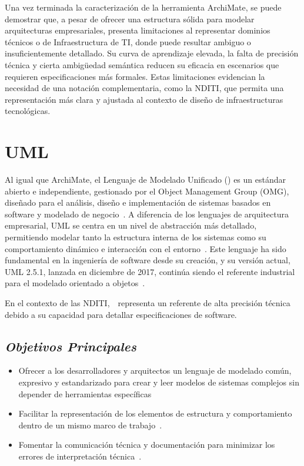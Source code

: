 Una vez terminada la caracterización de la herramienta ArchiMate, se puede demostrar que, a pesar de ofrecer una estructura sólida para modelar arquitecturas empresariales, presenta limitaciones al representar dominios técnicos o de Infraestructura de TI, donde puede resultar ambiguo o insuficientemente detallado. Su curva de aprendizaje elevada, la falta de precisión técnica y cierta ambigüedad semántica reducen su eficacia en escenarios que requieren especificaciones más formales. Estas limitaciones evidencian la necesidad de una notación complementaria, como la NDITI, que permita una representación más clara y ajustada al contexto de diseño de infraestructuras tecnológicas.

\section{UML}

Al igual que ArchiMate, el Lenguaje de Modelado Unificado (\UML) es un estándar abierto e independiente, gestionado por el Object Management Group (OMG), diseñado para el análisis, diseño e implementación de sistemas basados en software y modelado de negocio~\cite{OMG01}. A diferencia de los lenguajes de arquitectura empresarial, UML se centra en un nivel de abstracción más detallado, permitiendo modelar tanto la estructura interna de los sistemas como su comportamiento dinámico e interacción con el entorno~\cite{Booch01}. Este lenguaje ha sido fundamental en la ingeniería de software desde su creación, y su versión actual, UML 2.5.1, lanzada en diciembre de 2017, continúa siendo el referente industrial para el modelado orientado a objetos~\cite{OMG02}.

En el contexto de las NDITI,~\UML~representa un referente de alta precisión técnica debido a su capacidad para detallar especificaciones de software.


\subsection{\textit{Objetivos Principales}}
	
\begin{itemize}
	\item Ofrecer a los desarrolladores y arquitectos un lenguaje de modelado común, expresivo y estandarizado para crear y leer modelos de sistemas complejos sin depender de herramientas específicas~\cite{OMG03}
	\item Facilitar la representación de los elementos de estructura y comportamiento dentro de un mismo marco de trabajo~\cite{Booch01}.
	\item Fomentar la comunicación técnica y documentación para minimizar los errores de interpretación técnica~\cite{DBLP:series/utcs/SeidlSHK15}.
\end{itemize}

